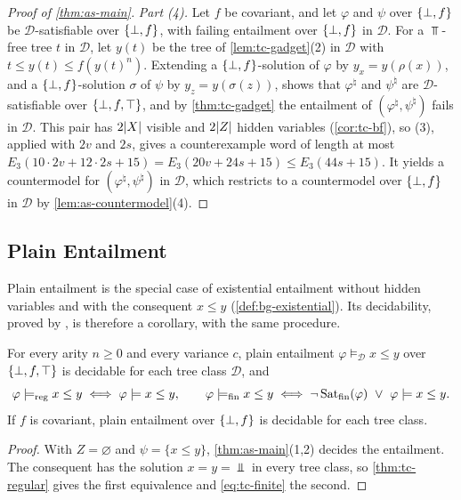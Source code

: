 \begin{proof}[Proof of \cref{thm:as-main}]
\emph{Part (4).} Let $f$ be covariant, and let $\varphi$ and $\psi$ over $\{\bot,f\}$
be $\mathcal D$-satisfiable over $\{\bot,f\}$, with failing entailment over $\{\bot,f\}$ in
$\mathcal D$. For a $\Top$-free tree $t$ in $\mathcal D$, let $y(t)$ be the
tree of \cref{lem:tc-gadget}(2) in $\mathcal D$ with $t\le y(t)\le
f(y(t)^n)$. Extending a $\{\bot,f\}$-solution of $\varphi$ by $y_x=y(\rho(x))$, and a
$\{\bot,f\}$-solution $\sigma$ of $\psi$ by $y_z=y(\sigma(z))$, shows that
$\varphi^\natural$ and $\psi^\natural$ are $\mathcal D$-satisfiable over $\{\bot,f,\top\}$,
and by \cref{thm:tc-gadget} the entailment of $(\varphi^\natural,
\psi^\natural)$ fails in $\mathcal D$. This pair has $2\lvert X\rvert$ visible and
$2\lvert Z\rvert$ hidden variables (\cref{cor:tc-bf}), so (3), applied with $2v$
and $2s$, gives a counterexample word of length at most
$E_3(10\cdot2v+12\cdot2s+15)=E_3(20v+24s+15)\le E_3(44s+15)$. It yields a countermodel for
$(\varphi^\natural,\psi^\natural)$ in $\mathcal D$, which restricts to a
countermodel over $\{\bot,f\}$ in $\mathcal D$ by \cref{lem:as-countermodel}(4).
\end{proof}

\subsection{Plain Entailment}\label{sec:as-plain}

Plain entailment is the special case of existential entailment without hidden
variables and with the consequent $x\le y$ (\cref{def:bg-existential}). Its
decidability, proved by \citet{Zhao26}, is therefore a corollary, with the same
procedure.

\begin{corollary}\label{cor:as-plain}
For every arity $n\ge0$ and every variance $c$, plain entailment
$\varphi\models_{\mathcal D}x\le y$ over $\{\bot,f,\top\}$ is decidable for each tree class
$\mathcal D$, and
\[
 \varphi\models_{\mathrm{reg}}x\le y\iff\varphi\models x\le y,\qquad
 \varphi\models_{\mathrm{fin}}x\le y\iff
 \neg\operatorname{Sat}_{\mathrm{fin}}(\varphi)\ \lor\ \varphi\models x\le y .
\]
If $f$ is covariant, plain entailment over $\{\bot,f\}$ is decidable for each tree
class.
\end{corollary}

\begin{proof}
With $Z=\varnothing$ and $\psi=\{x\le y\}$, \cref{thm:as-main}(1,2) decides the
entailment. The consequent has the solution $x=y=\Bot$ in every tree class, so
\cref{thm:tc-regular} gives the first equivalence and \cref{eq:tc-finite} the
second.
\end{proof}
